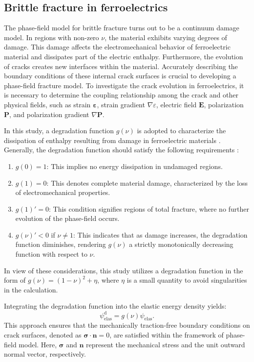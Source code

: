\documentclass[times,fleqn,11pt]{elsarticle}
\begin{document}
\subsection{Brittle fracture in ferroelectrics}
The phase-field model for brittle fracture turns out to be a continuum damage model. In regions with non-zero $\nu$, the material exhibits varying degrees of damage. This damage affects the electromechanical behavior of ferroelectric material and dissipates part of the electric enthalpy. Furthermore, the evolution of cracks creates new interfaces within the material. Accurately describing the boundary conditions of these internal crack surfaces is crucial to developing a phase-field fracture model. To investigate the crack evolution in ferroelectrics, it is necessary to determine the coupling relationship among the crack and other physical fields, such as strain $\mathbf{\varepsilon}$, strain gradient $\nabla \varepsilon$, electric field $\mathbf{E}$, polarization $\mathbf{P}$, and polarization gradient $\nabla \mathbf{P}$. 

In this study, a degradation function $g(\nu)$ is adopted to characterize the dissipation of enthalpy resulting from damage in ferroelectric materials \cite{abdollahi_phase-field_2011,xu_fracture_2010}. Generally, the degradation function should satisfy the following requirements \cite{miehe_thermodynamically_2010}:
\begin{enumerate}
    \item $g(0) = 1 $: This implies no energy dissipation in undamaged regions.
    \item $g(1) = 0 $: This denotes complete material damage, characterized by the loss of electromechanical properties.
    \item $g(1)' = 0$: This condition signifies regions of total fracture, where no further evolution of the phase-field occurs.
    \item $g(\nu)'<0$ if $\nu\neq 1$: This indicates that as damage increases, the degradation function diminishes, rendering $g(\nu)$ a strictly monotonically decreasing function with respect to $\nu$.
\end{enumerate}
In view of these considerations, this study utilizes a degradation function in the form of $g(\nu)=(1-\nu)^2+\eta$, where $\eta$ is a small quantity to avoid singularities in the calculation. 

Integrating the degradation function into the elastic energy density yields:
\begin{equation}
    \psi_{\mathrm{elas}}^\mathrm{d}=g(\nu)\psi_{\mathrm{elas}}.
\end{equation}
This approach ensures that the mechanically traction-free boundary conditions on crack surfaces, denoted as $\mathbf{\sigma}\cdot\mathbf{n}=0$, are satisfied within the framework of phase-field model. Here, $\mathbf{\sigma}$ and $\mathbf{n}$ represent the mechanical stress and the unit outward normal vector, respectively.
\end{document}

